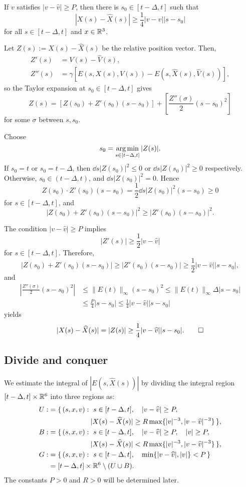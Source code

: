 \documentclass[12pt]{article}
\begin{document}
\begin{lem}
If $v$ satisfies $|v-\hat v|\ge P$, then there is $s_0\in[t-\Delta,t]$ such that
\[|X(s)-\hat X(s)|\ge\frac14|v-\hat v||s-s_0|\]
for all $s\in[t-\Delta,t]$ and $x\in\R^3$.
\end{lem}
\begin{pf}
Let $Z(s):=X(s)-\hat X(s)$ be the relative position vector.
Then,
\begin{align*}
Z'(s)&=V(s)-\hat V(s),\\
Z''(s)&=\gamma[E(s,X(s),V(s))-E(s,\hat X(s),\hat V(s))],
\end{align*}
so the Taylor expansion at $s_0\in[t-\Delta,t]$ gives
\[Z(s)=\left[Z(s_0)+Z'(s_0)(s-s_0)\right]+\left[\frac{Z''(\sigma)}2(s-s_0)^2\right]\]
for some $\sigma$ between $s,s_0$.

Choose
\[s_0=\argmin_{s\in[t-\Delta,t]}|Z(s)|.\]
If $s_0=t$ or $s_0=t-\Delta$, then $\dd{s}|Z(s_0)|^2\le0$ or $\dd{s}|Z(s_0)|^2\ge0$ respectively.
Otherwise, $s_0\in(t-\Delta,t)$, and $\dd{s}|Z(s_0)|^2=0$.
Hence
\[Z(s_0)\cdot Z'(s_0)(s-s_0)=\frac12\dd{s}|Z(s_0)|^2(s-s_0)\ge0\]
for $s\in[t-\Delta,t]$, and
\[|Z(s_0)+Z'(s_0)(s-s_0)|^2\ge|Z'(s_0)(s-s_0)|^2.\]

The condition $|v-\hat v|\ge P$ implies
\[|Z'(s)|\ge\frac12|v-\hat v|\]
for $s\in[t-\Delta,t]$.
Therefore,
\[|Z(s_0)+Z'(s_0)(s-s_0)|\ge|Z'(s_0)(s-s_0)|\ge\frac12|v-\hat v||s-s_0|,\]
and
\begin{align*}
|\frac{Z''(\sigma)}2(s-s_0)^2|
&\le\|E(t)\|_\infty(s-s_0)^2
\le\|E(t)\|_\infty\Delta|s-s_0|\\
&\le\frac P4|s-s_0|
\le\frac14|v-\hat v||s-s_0|
\end{align*}
yields
\[|X(s)-\hat X(s)|=|Z(s)|\ge\frac14|v-\hat v||s-s_0|.\qedhere\]
\end{pf}


\subsection{Divide and conquer}

We estimate the integral of $|E(s,\hat X(s))|$ by dividing the integral region $[t-\Delta,t]\times\R^6$ into three regions as:
\begin{align*}
U:&=\{\,(s,x,v):\ s\in[t-\Delta,t],\quad|v-\hat v|\ge P,\\
&\hspace{6em}|X(s)-\hat X(s)|\ge R\max\{|v|^{-3},|v-\hat v|^{-3}\}\,\},\\
B:&=\{\,(s,x,v):\ s\in[t-\Delta,t],\quad|v-\hat v|\ge P,\quad|v|\ge P,\\
&\hspace{6em}|X(s)-\hat X(s)|<R\max\{|v|^{-3},|v-\hat v|^{-3}\}\,\},\\
G:&=\{\,(s,x,v):\ s\in[t-\Delta,t],\quad\min\{|v-\hat v|,|v|\}<P\,\}\\
&=[t-\Delta,t]\times\R^6\setminus(U\cup B).
\end{align*}
The constants $P>0$ and $R>0$ will be determined later.
\end{document}
